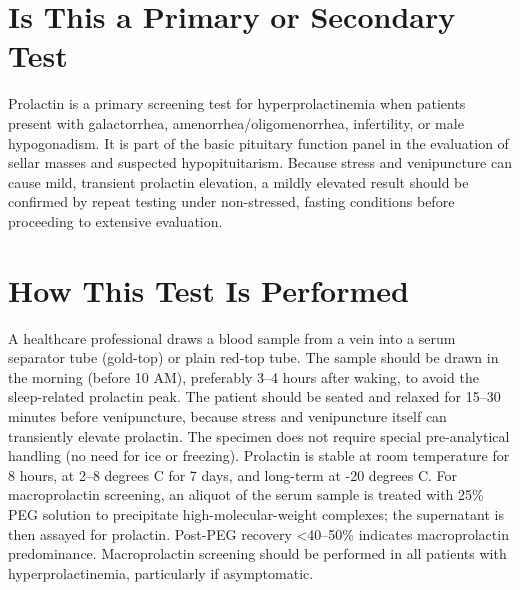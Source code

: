 \section*{Is This a Primary or Secondary Test}
Prolactin is a primary screening test for hyperprolactinemia when patients present with galactorrhea, amenorrhea/oligomenorrhea, infertility, or male hypogonadism. It is part of the basic pituitary function panel in the evaluation of sellar masses and suspected hypopituitarism. Because stress and venipuncture can cause mild, transient prolactin elevation, a mildly elevated result should be confirmed by repeat testing under non-stressed, fasting conditions before proceeding to extensive evaluation.

\section*{How This Test Is Performed}
A healthcare professional draws a blood sample from a vein into a serum separator tube (gold-top) or plain red-top tube. The sample should be drawn in the morning (before 10 AM), preferably 3--4 hours after waking, to avoid the sleep-related prolactin peak. The patient should be seated and relaxed for 15--30 minutes before venipuncture, because stress and venipuncture itself can transiently elevate prolactin. The specimen does not require special pre-analytical handling (no need for ice or freezing). Prolactin is stable at room temperature for 8 hours, at 2--8 degrees C for 7 days, and long-term at -20 degrees C. For macroprolactin screening, an aliquot of the serum sample is treated with 25\% PEG solution to precipitate high-molecular-weight complexes; the supernatant is then assayed for prolactin. Post-PEG recovery <40--50\% indicates macroprolactin predominance. Macroprolactin screening should be performed in all patients with hyperprolactinemia, particularly if asymptomatic.

